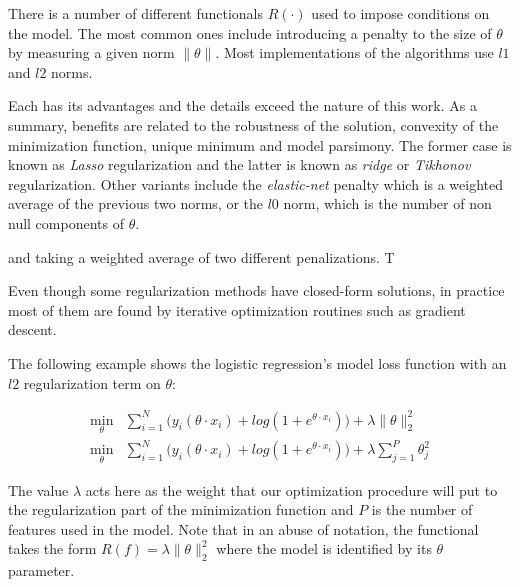 There is a number of different functionals $R(\cdot)$ used to impose conditions on the model. The most common ones include introducing a penalty to the size of $\theta$ by measuring a given norm  $\| \theta \|$.  Most implementations of the algorithms use $l1$ and $l2$ norms.

Each has its advantages and the details exceed the nature of this work. As a summary, benefits are related to the robustness of the solution, convexity of the minimization function, unique minimum and model parsimony. The former case is known as \textit{ Lasso} regularization and the latter is known as \textit{ridge} or \textit{Tikhonov} regularization. Other variants include the \textit{elastic-net} penalty which is a weighted average of the previous two norms, or the $l0$ norm, which is the number of non null components of $\theta$.


and taking a weighted average of two different penalizations. T

Even though some regularization methods have closed-form solutions, in practice most of them are found by iterative optimization routines such as gradient descent.

The following example shows the logistic regression's model loss function with an $l2$ regularization term on $\theta$:

\begin{equation} \label{logitRegularization}
\begin{split}
\min_{\theta} &  \sum_{i=1}^N \big(y_i ( \theta \cdot x_i ) + log(1 + e^{\theta \cdot x_i} ) \big)  +  \lambda \| \theta\|_{2}^2 \\
\min_{\theta} &  \sum_{i=1}^N \big(y_i ( \theta \cdot x_i ) + log(1 + e^{\theta \cdot x_i} ) \big) +  \lambda \sum_{j=1}^P  \theta_j^2
\end{split}
\end{equation}


%


The value $\lambda$ acts here as the weight that our optimization procedure will put to the regularization part of the minimization function and $P$  is the number of features used in the model. Note that in an abuse of notation, the functional takes the form  $R(f) = \lambda\| \theta\|_{2}^2$ where the model is identified by its $\theta$ parameter.

